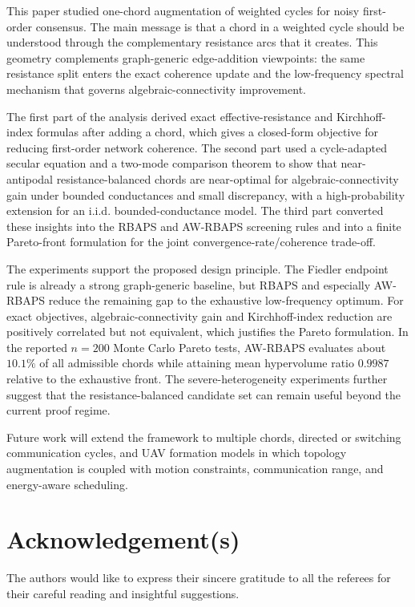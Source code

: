 \documentclass[11pt]{article}
\numberwithin{equation}{section}
\theoremstyle{definition}
\theoremstyle{remark}
\begin{document}
This paper studied one-chord augmentation of weighted cycles for noisy first-order consensus. The main message is that a chord in a weighted cycle should be understood through the complementary resistance arcs that it creates. This geometry complements graph-generic edge-addition viewpoints: the same resistance split enters the exact coherence update and the low-frequency spectral mechanism that governs algebraic-connectivity improvement.

The first part of the analysis derived exact effective-resistance and Kirchhoff-index formulas after adding a chord, which gives a closed-form objective for reducing first-order network coherence. The second part used a cycle-adapted secular equation and a two-mode comparison theorem to show that near-antipodal resistance-balanced chords are near-optimal for algebraic-connectivity gain under bounded conductances and small discrepancy, with a high-probability extension for an i.i.d. bounded-conductance model. The third part converted these insights into the RBAPS and AW-RBAPS screening rules and into a finite Pareto-front formulation for the joint convergence-rate/coherence trade-off.

The experiments support the proposed design principle. The Fiedler endpoint rule is already a strong graph-generic baseline, but RBAPS and especially AW-RBAPS reduce the remaining gap to the exhaustive low-frequency optimum. For exact objectives, algebraic-connectivity gain and Kirchhoff-index reduction are positively correlated but not equivalent, which justifies the Pareto formulation. In the reported $n=200$ Monte Carlo Pareto tests, AW-RBAPS evaluates about $10.1\%$ of all admissible chords while attaining mean hypervolume ratio $0.9987$ relative to the exhaustive front. The severe-heterogeneity experiments further suggest that the resistance-balanced candidate set can remain useful beyond the current proof regime.

Future work will extend the framework to multiple chords, directed or switching communication cycles, and UAV formation models in which topology augmentation is coupled with motion constraints, communication range, and energy-aware scheduling.

\section*{Acknowledgement(s)}
The authors would like to express their sincere gratitude to all the referees for their careful reading and insightful suggestions. 
\end{document}
